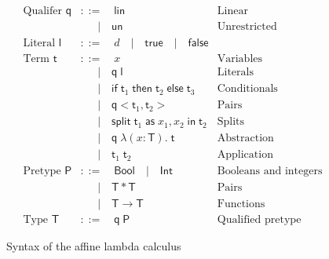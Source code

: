 \documentclass[10pt, english, a4paper]{article}
\begin{document}
\begin{figure}
\begin{align*}
\text{Qualifer }\mathsf{q} &::=\quad\mathsf{lin}&\text{Linear}\\
                           &\quad\;\;|\quad\mathsf{un}&\text{Unrestricted}\\
\text{Literal }\mathsf{l}  &::=\quad d\quad|\quad \mathsf{true}\quad|\quad\mathsf{false}\\
\text{Term }\mathsf{t}     &::=\quad x &\text{Variables}\\
                           &\quad\;\;|\quad\mathsf{q}\;\mathsf{l}&\text{Literals}\\
                           &\quad\;\;|\quad \mathsf{if}\;\mathsf{t}_1\;\mathsf{then}\;\mathsf{t}_2\;\mathsf{else}\;\mathsf{t}_3&\text{Conditionals}\\
                           &\quad\;\;|\quad\mathsf{q}<\mathsf{t}_1,\mathsf{t}_2>&\text{Pairs}\\
                           &\quad\;\;|\quad \mathsf{split}\;\mathsf{t}_1\;\mathsf{as}\;x_1,x_2\;\mathsf{in}\;\mathsf{t}_2&\text{Splits}\\
                           &\quad\;\;|\quad \mathsf{q}\;\lambda(x:\mathsf{T}).\;\mathsf{t}&\text{Abstraction}\\
                           &\quad\;\;|\quad\mathsf{t}_1\;\mathsf{t}_2&\text{Application}\\
\text{Pretype }\mathsf{P}  &::= \quad\mathsf{Bool}\quad|\quad\mathsf{Int}&\text{Booleans and integers}\\
                           &\quad\;\;|\quad\mathsf{T} * \mathsf{T}&\text{Pairs}\\
                           &\quad\;\;|\quad\mathsf{T}\rightarrow\mathsf{T}&\text{Functions}\\
\text{Type }\mathsf{T}      &::=\quad\mathsf{q}\;\mathsf{P}&\text{Qualified pretype}
\end{align*}
\caption{Syntax of the affine lambda calculus}
\end{figure}
\end{document}
